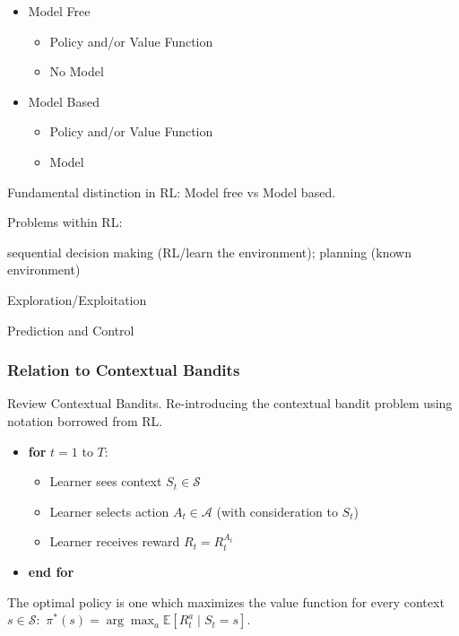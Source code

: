 \documentclass[english]{article}
\newenvironment{grey}{\color{blue}}{\ignorespacesafterend}
\begin{document}
 
\begin{itemize}
    \item Model Free
    \begin{itemize}
        \item Policy and/or Value Function
        \item \begin{grey}No Model\end{grey}
    \end{itemize}
    \item Model Based
    \begin{itemize}
        \item Policy and/or Value Function
        \item Model
    \end{itemize}
\end{itemize}
 
\item Fundamental distinction in RL: Model free vs Model based.

\item Problems within RL: 

sequential decision making (RL/learn the environment); planning (known environment)

Exploration/Exploitation

Prediction and Control


\eenum
\subsubsection{Relation to Contextual Bandits}
\benum

\item {Review Contextual Bandits}.
Re-introducing the contextual bandit problem using notation borrowed from RL.
\begin{itemize}
    \item[] \textbf{for} $t = 1$ to $T$:
    \begin{itemize}
        \item[] Learner sees context $S_t \in \mathcal{S}$
        \item[] Learner selects action $A_t \in \mathcal{A}$ (with consideration to $S_t$)
        \item[] Learner receives reward $R_t = R_t^{A_t}$
    \end{itemize}
    \item[] \textbf{end for}
\end{itemize}
The optimal policy is one which maximizes the value function for every context $s \in \mathcal{S}:$ $\pi^*(s) = \arg\max_a \mathbb{E}[R^a_t \mid S_t = s]$.
\end{document}
